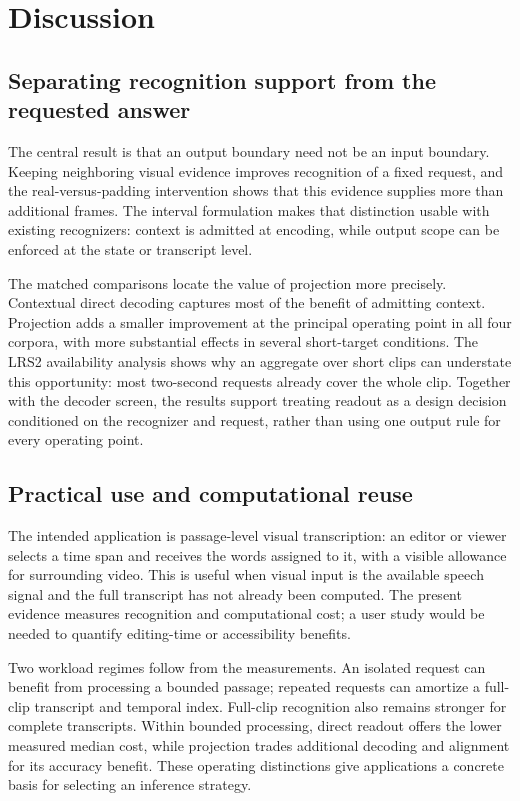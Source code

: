 \section{Discussion}

\subsection{Separating recognition support from the requested answer}
The central result is that an output boundary need not be an input boundary.
Keeping neighboring visual evidence improves recognition of a fixed request,
and the real-versus-padding intervention shows that this evidence supplies more
than additional frames. The interval formulation makes that distinction usable
with existing recognizers: context is admitted at encoding, while output scope
can be enforced at the state or transcript level.

The matched comparisons locate the value of projection more precisely.
Contextual direct decoding captures most of the benefit of admitting context.
Projection adds a smaller improvement at the principal operating point in all
four corpora, with more substantial effects in several short-target conditions.
The LRS2 availability analysis shows why an aggregate over short clips can
understate this opportunity: most two-second requests already cover the whole
clip. Together with the decoder screen, the results support treating readout as
a design decision conditioned on the recognizer and request, rather than using
one output rule for every operating point.

\subsection{Practical use and computational reuse}
The intended application is passage-level visual transcription: an editor or
viewer selects a time span and receives the words assigned to it, with a visible
allowance for surrounding video. This is useful when visual input is the
available speech signal and the full transcript has not already been computed.
The present evidence measures recognition and computational cost; a user study
would be needed to quantify editing-time or accessibility benefits.

Two workload regimes follow from the measurements. An isolated request can
benefit from processing a bounded passage; repeated requests can amortize a
full-clip transcript and temporal index. Full-clip recognition also remains
stronger for complete transcripts. Within bounded processing, direct readout
offers the lower measured median cost, while projection trades additional
decoding and alignment for its accuracy benefit. These operating distinctions
give applications a concrete basis for selecting an inference strategy.

